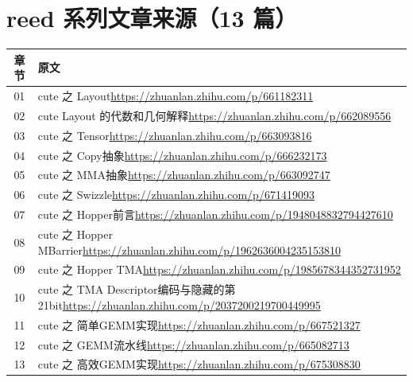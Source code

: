 \documentclass[9pt,openany]{ctexbook}
\begin{document}
\section*{reed 系列文章来源（13 篇）}
\begingroup\small
\begin{tabular}{@{}c>{\raggedright\arraybackslash}p{}@{}}
  \toprule
  章节 & 原文 \\
  \midrule
  01 & cute 之 Layout\newline\url{https://zhuanlan.zhihu.com/p/661182311} \\
  02 & cute Layout 的代数和几何解释\newline\url{https://zhuanlan.zhihu.com/p/662089556} \\
  03 & cute 之 Tensor\newline\url{https://zhuanlan.zhihu.com/p/663093816} \\
  04 & cute 之 Copy抽象\newline\url{https://zhuanlan.zhihu.com/p/666232173} \\
  05 & cute 之 MMA抽象\newline\url{https://zhuanlan.zhihu.com/p/663092747} \\
  06 & cute 之 Swizzle\newline\url{https://zhuanlan.zhihu.com/p/671419093} \\
  07 & cute 之 Hopper前言\newline\url{https://zhuanlan.zhihu.com/p/1948048832794427610} \\
  08 & cute 之 Hopper MBarrier\newline\url{https://zhuanlan.zhihu.com/p/1962636004235153810} \\
  09 & cute 之 Hopper TMA\newline\url{https://zhuanlan.zhihu.com/p/1985678344352731952} \\
  10 & cute 之 TMA Descriptor编码与隐藏的第21bit\newline\url{https://zhuanlan.zhihu.com/p/2037200219700449995} \\
  11 & cute 之 简单GEMM实现\newline\url{https://zhuanlan.zhihu.com/p/667521327} \\
  12 & cute 之 GEMM流水线\newline\url{https://zhuanlan.zhihu.com/p/665082713} \\
  13 & cute 之 高效GEMM实现\newline\url{https://zhuanlan.zhihu.com/p/675308830} \\
  \bottomrule
\end{tabular}
\endgroup
\end{document}
